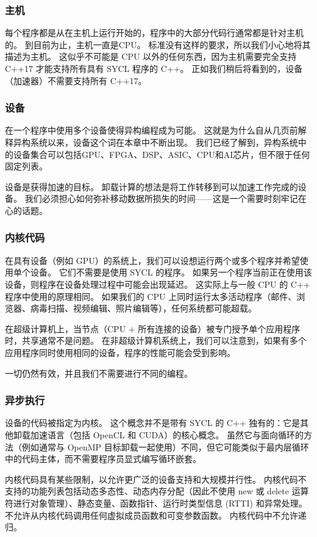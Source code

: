\subsubsection{主机}
每个程序都是从在主机上运行开始的，程序中的大部分代码行通常都是针对主机的。 到目前为止，主机一直是CPU。 标准没有这样的要求，所以我们小心地将其描述为主机。 这似乎不可能是 CPU 以外的任何东西，因为主机需要完全支持 C++17 才能支持所有具有 SYCL 程序的 C++。 正如我们稍后将看到的，设备（加速器）不需要支持所有 C++17。

\subsubsection{设备}
在一个程序中使用多个设备使得异构编程成为可能。 这就是为什么自从几页前解释异构系统以来，设备这个词在本章中不断出现。 我们已经了解到，异构系统中的设备集合可以包括GPU、FPGA、DSP、ASIC、CPU和AI芯片，但不限于任何固定列表。

设备是获得加速的目标。 卸载计算的想法是将工作转移到可以加速工作完成的设备。 我们必须担心如何弥补移动数据所损失的时间——这是一个需要时刻牢记在心的话题。

\subsubsection{内核代码}
在具有设备（例如 GPU）的系统上，我们可以设想运行两个或多个程序并希望使用单个设备。 它们不需要是使用 SYCL 的程序。 如果另一个程序当前正在使用该设备，则程序在设备处理过程中可能会出现延迟。 这实际上与一般 CPU 的 C++ 程序中使用的原理相同。 如果我们的 CPU 上同时运行太多活动程序（邮件、浏览器、病毒扫描、视频编辑、照片编辑等），任何系统都可能超载。

在超级计算机上，当节点（CPU + 所有连接的设备）被专门授予单个应用程序时，共享通常不是问题。 在非超级计算机系统上，我们可以注意到，如果有多个应用程序同时使用相同的设备，程序的性能可能会受到影响。

一切仍然有效，并且我们不需要进行不同的编程。

\subsubsection{异步执行}
设备的代码被指定为内核。 这个概念并不是带有 SYCL 的 C++ 独有的：它是其他卸载加速语言（包括 OpenCL 和 CUDA）的核心概念。 虽然它与面向循环的方法（例如通常与 OpenMP 目标卸载一起使用）不同，但它可能类似于最内层循环中的代码主体，而不需要程序员显式编写循环嵌套。

内核代码具有某些限制，以允许更广泛的设备支持和大规模并行性。 内核代码不支持的功能列表包括动态多态性、动态内存分配（因此不使用 new 或 delete 运算符进行对象管理）、静态变量、函数指针、运行时类型信息 (RTTI) 和异常处理。 不允许从内核代码调用任何虚拟成员函数和可变参数函数。 内核代码中不允许递归。

